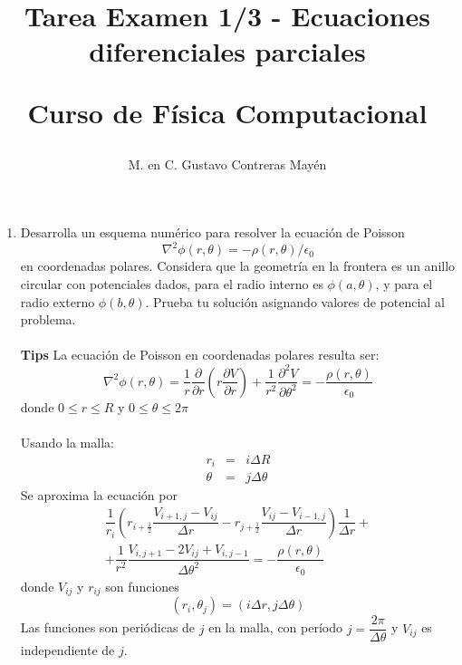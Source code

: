 \documentclass[letterpaper]{article}
\title{Tarea Examen 1/3 - Ecuaciones diferenciales parciales \\ \begin{large}Curso de Física Computacional\end{large}}
\author{M. en C. Gustavo Contreras Mayén}
\date{ }
\begin{document}
\maketitle
\fontsize{14}{14}\selectfont
{}
\begin{enumerate}
\item Desarrolla un esquema num\'{e}rico para resolver la ecuaci\'{o}n de Poisson
\[ \nabla^{2} \phi (r,\theta) = - \rho (r, \theta) / \epsilon_{0} \]
en coordenadas polares. Considera que la geometr\'{i}a en la frontera es un anillo circular con potenciales dados, para el radio interno es $\phi(a,\theta)$, y para el radio externo $\phi(b,\theta)$. Prueba tu soluci\'{o}n asignando valores de potencial al problema.
\\
\\
\textbf{Tips}
La ecuaci\'{o}n de Poisson en coordenadas polares resulta ser:
\[ \nabla^{2} \phi (r,\theta) = \dfrac{1}{r} \dfrac{\partial}{\partial r} \left( r \dfrac{\partial V}{\partial r} \right) + \dfrac{1}{r^{2}} \dfrac{\partial^{2} V}{\partial \theta^{2}} = - \dfrac{\rho(r,\theta)}{\epsilon_{0}} \]
donde $0 \leq r \leq R $ y $0 \leq \theta \leq 2 \pi$
\\
\\
Usando la malla:
\begin{eqnarray*}
r_{i} &=& i \Delta R \\
\theta &=& j \Delta \theta
\end{eqnarray*}
Se aproxima la ecuaci\'{o}n por
\[ \begin{split}
\dfrac{1}{r_{i}} \left( r_{i+\frac{1}{2}} \dfrac{V_{i+1,j} - V_{ij}}{\Delta r} - r_{j+\frac{1}{2}} \dfrac{V_{ij}-V_{i-1,j}}{\Delta r} \right) \dfrac{1}{\Delta r} + \\
+ \dfrac{1}{r^{2}} \dfrac{V_{i,j+1}-2V_{ij}+V_{i,j-1}}{\Delta \theta^{2}} = - \dfrac{\rho(r,\theta)}{\epsilon_{0}}
\end{split} \]
donde $V_{ij}$ y $r_{ij}$ son funciones
\[ (r_{i}, \theta_{j}) = (i \Delta r, j \Delta \theta) \]
Las funciones son peri\'{o}dicas de $j$ en la malla, con per\'{i}odo $j=\dfrac{2 \pi}{\Delta \theta}$  y $V_{ij}$ es independiente de $j$.
\end{enumerate}
\end{document}
